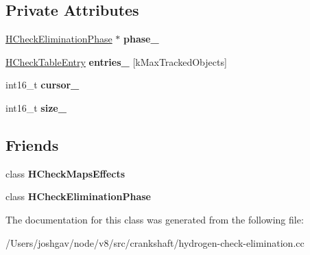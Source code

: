 \subsection*{Private Attributes}
\begin{DoxyCompactItemize}
\item 
\hyperlink{classv8_1_1internal_1_1_h_check_elimination_phase}{H\+Check\+Elimination\+Phase} $\ast$ {\bfseries phase\+\_\+}\hypertarget{classv8_1_1internal_1_1_h_check_table_a257497f9d482ff9afa693fff0b60103a}{}\label{classv8_1_1internal_1_1_h_check_table_a257497f9d482ff9afa693fff0b60103a}

\item 
\hyperlink{structv8_1_1internal_1_1_h_check_table_entry}{H\+Check\+Table\+Entry} {\bfseries entries\+\_\+} \mbox{[}k\+Max\+Tracked\+Objects\mbox{]}\hypertarget{classv8_1_1internal_1_1_h_check_table_a316d70bb6b5b692745c65ffbc0448cb2}{}\label{classv8_1_1internal_1_1_h_check_table_a316d70bb6b5b692745c65ffbc0448cb2}

\item 
int16\+\_\+t {\bfseries cursor\+\_\+}\hypertarget{classv8_1_1internal_1_1_h_check_table_afa3660168e3ef4c80b1876e132fd6048}{}\label{classv8_1_1internal_1_1_h_check_table_afa3660168e3ef4c80b1876e132fd6048}

\item 
int16\+\_\+t {\bfseries size\+\_\+}\hypertarget{classv8_1_1internal_1_1_h_check_table_a083d306a47b238116fd4fe7e2dd11722}{}\label{classv8_1_1internal_1_1_h_check_table_a083d306a47b238116fd4fe7e2dd11722}

\end{DoxyCompactItemize}
\subsection*{Friends}
\begin{DoxyCompactItemize}
\item 
class {\bfseries H\+Check\+Maps\+Effects}\hypertarget{classv8_1_1internal_1_1_h_check_table_a017edd7762a38d25c359804dc91a414d}{}\label{classv8_1_1internal_1_1_h_check_table_a017edd7762a38d25c359804dc91a414d}

\item 
class {\bfseries H\+Check\+Elimination\+Phase}\hypertarget{classv8_1_1internal_1_1_h_check_table_ae9ebe4112a895f7615fe04f5d1cd0679}{}\label{classv8_1_1internal_1_1_h_check_table_ae9ebe4112a895f7615fe04f5d1cd0679}

\end{DoxyCompactItemize}


The documentation for this class was generated from the following file\+:\begin{DoxyCompactItemize}
\item 
/\+Users/joshgav/node/v8/src/crankshaft/hydrogen-\/check-\/elimination.\+cc\end{DoxyCompactItemize}
